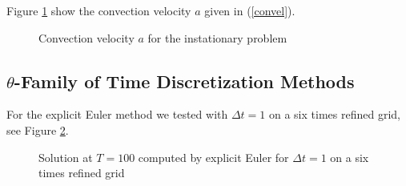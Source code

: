 \documentclass[a4paper, 11pt, twoside]{article}
\begin{document}
Figure \ref{convectinvelocity} show the convection velocity $a$ given in (\ref{convel}).
	
\begin{figure}[htbp]
\begin{center}
\caption{Convection velocity $a$ for the instationary problem}
\label{convectinvelocity}
\end{center}
\end{figure}

\subsection{$\theta$-Family of Time Discretization Methods}

For the explicit Euler method  we tested with $\Delta t = 1$ on a six times refined grid, see Figure \ref{explicit}.

\begin{figure}[htbp]
\begin{center}
\caption{Solution at $T = 100$ computed by explicit Euler for $\Delta t = 1$ on a six times refined grid}
\label{explicit}
\end{center}
\end{figure}
\end{document}
